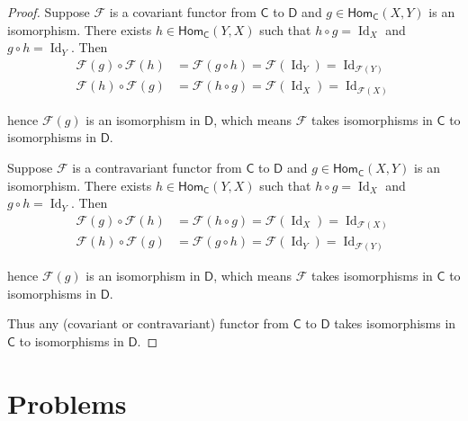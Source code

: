 \begin{proof}
    Suppose \( \mathscr{F} \) is a covariant functor from \( \mathsf{C} \) to \( \mathsf{D} \) and \( g \in \mathsf{Hom}_{\mathsf{C}}(X, Y) \) is an isomorphism. There exists \( h \in \mathsf{Hom}_{\mathsf{C}}(Y, X) \) such that \( h \circ g = \operatorname{Id}_{X} \) and \( g \circ h = \operatorname{Id}_{Y} \). Then
    \begingroup
    \allowdisplaybreaks%
    \begin{align*}
        \mathscr{F}(g) \circ \mathscr{F}(h) & = \mathscr{F}(g \circ h) = \mathscr{F}(\operatorname{Id}_{Y}) = \operatorname{Id}_{\mathscr{F}(Y)} \\
        \mathscr{F}(h) \circ \mathscr{F}(g) & = \mathscr{F}(h \circ g) = \mathscr{F}(\operatorname{Id}_{X}) = \operatorname{Id}_{\mathscr{F}(X)}
    \end{align*}
    \endgroup

    hence \( \mathscr{F}(g) \) is an isomorphism in \( \mathsf{D} \), which means \( \mathscr{F} \) takes isomorphisms in \( \mathsf{C} \) to isomorphisms in \( \mathsf{D} \).

    Suppose \( \mathscr{F} \) is a contravariant functor from \( \mathsf{C} \) to \( \mathsf{D} \) and \( g \in \mathsf{Hom}_{\mathsf{C}}(X, Y) \) is an isomorphism. There exists \( h \in \mathsf{Hom}_{\mathsf{C}}(Y, X) \) such that \( h \circ g = \operatorname{Id}_{X} \) and \( g \circ h = \operatorname{Id}_{Y} \). Then
    \begingroup
    \allowdisplaybreaks%
    \begin{align*}
        \mathscr{F}(g) \circ \mathscr{F}(h) & = \mathscr{F}(h \circ g) = \mathscr{F}(\operatorname{Id}_{X}) = \operatorname{Id}_{\mathscr{F}(X)} \\
        \mathscr{F}(h) \circ \mathscr{F}(g) & = \mathscr{F}(g \circ h) = \mathscr{F}(\operatorname{Id}_{Y}) = \operatorname{Id}_{\mathscr{F}(Y)}
    \end{align*}
    \endgroup

    hence \( \mathscr{F}(g) \) is an isomorphism in \( \mathsf{D} \), which means \( \mathscr{F} \) takes isomorphisms in \( \mathsf{C} \) to isomorphisms in \( \mathsf{D} \).

    Thus any (covariant or contravariant) functor from \( \mathsf{C} \) to \( \mathsf{D} \) takes isomorphisms in \( \mathsf{C} \) to isomorphisms in \( \mathsf{D} \).
\end{proof}

\section{Problems}

